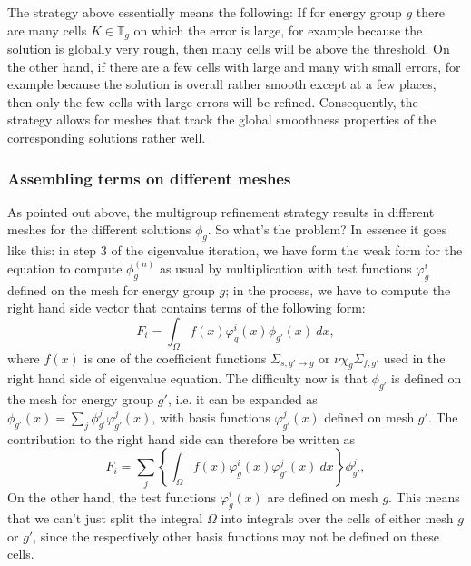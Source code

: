 \documentclass{article}
\begin{document}
The strategy above essentially means the following: If for energy group $g$
there are many cells $K\in {\mathbb T}_g$ on which the error is large, for
example because the solution is globally very rough, then many cells will be
above the threshold. On the other hand, if there are a few cells with large
and many with small errors, for example because the solution is overall rather
smooth except at a few places, then only the few cells with large errors will
be refined. Consequently, the strategy allows for meshes that track the global
smoothness properties of the corresponding solutions rather well.


\subsubsection{Assembling terms on different meshes}

As pointed out above, the multigroup refinement strategy results in
different meshes for the different solutions $\phi_g$. So what's the problem?
In essence it goes like this: in step 3 of the eigenvalue iteration, we have
form the weak form for the equation to compute $\phi_g^{(n)}$ as usual by
multiplication with test functions $\varphi_g^i$ defined on the mesh for
energy group $g$; in the process, we have to
compute the right hand side vector that contains terms of the following form:
\begin{equation}
  F_i = \int_\Omega f(x) \varphi_g^i(x) \phi_{g'}(x) \ dx,
\end{equation}
where $f(x)$ is one of the coefficient functions $\Sigma_{s,g'\to g}$ or
$\nu\chi_g\Sigma_{f,g'}$ used in the right hand side 
of eigenvalue equation. The difficulty now is that $\phi_{g'}$ is defined on
the mesh for energy group $g'$, i.e. it can be expanded as
$\phi_{g'}(x)=\sum_j\phi_{g'}^j \varphi_{g'}^j(x)$, with basis functions
$\varphi_{g'}^j(x)$ defined on mesh $g'$. The contribution to the right hand
side can therefore be written as
\begin{equation}
  F_i = \sum_j \left\{\int_\Omega f(x) \varphi_g^i(x) \varphi_{g'}^j(x) 
  \ dx \right\} \phi_{g'}^j , 
\end{equation}
On the other hand, the test functions $\varphi_g^i(x)$ are defined on mesh
$g$. This means that we can't just split the integral $\Omega$ into integrals
over the cells of either mesh $g$ or $g'$, since the respectively other basis
functions may not be defined on these cells.
\end{document}
